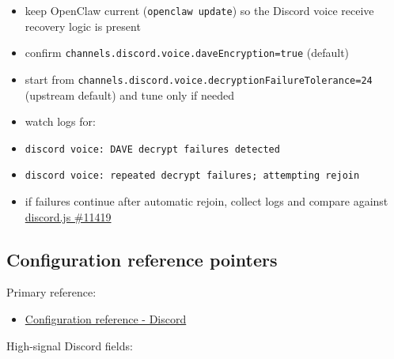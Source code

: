 \begin{itemize}
  \item keep OpenClaw current (\texttt{openclaw update}) so the Discord voice receive recovery logic is present
  \item confirm \texttt{channels.discord.voice.daveEncryption=true} (default)
  \item start from \texttt{channels.discord.voice.decryptionFailureTolerance=24} (upstream default) and tune only if needed
  \item watch logs for:
  \item \texttt{discord voice: DAVE decrypt failures detected}
  \item \texttt{discord voice: repeated decrypt failures; attempting rejoin}
  \item if failures continue after automatic rejoin, collect logs and compare against \href{https://github.com/discordjs/discord.js/issues/11419}{discord.js \#11419}
\end{itemize}



\subsection{Configuration reference pointers}


Primary reference:

\begin{itemize}
  \item \href{/gateway/configuration-reference\#discord}{Configuration reference - Discord}
\end{itemize}


High-signal Discord fields:

